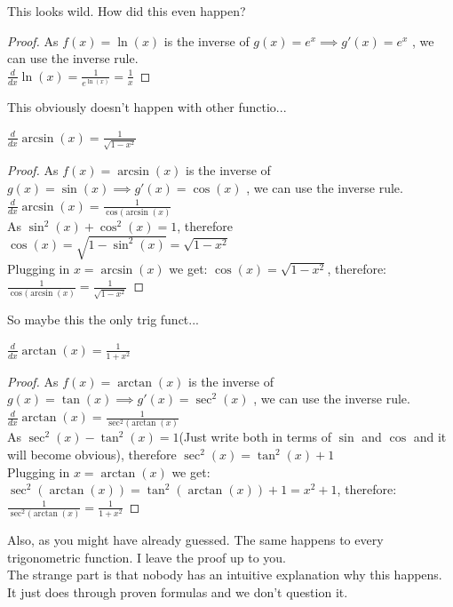 This looks wild. How did this even happen?\\
\begin{proof}
    As $f(x)=\ln(x)$ is the inverse of $g(x)=e^x \implies g'(x)=e^x$ , we can use the inverse rule.\\
    $\frac{d}{dx} \ln(x) = \frac{1}{e^{\ln(x)}}=\frac{1}{x}$
\end{proof}
This obviously doesn't happen with other functio...\\
\begin{theorem}
    $\frac{d}{dx} \arcsin(x)=\frac{1}{\sqrt{1-x^2}}$
\end{theorem}
\begin{proof}
    As $f(x)=\arcsin(x)$ is the inverse of $g(x)=\sin(x) \implies g'(x)=\cos(x)$ , we can use the inverse rule.\\
    $\frac{d}{dx} \arcsin(x) = \frac{1}{\cos(\arcsin(x)}$\\
    As $\sin^2(x)+\cos^2(x)=1$, therefore $\cos(x)=\sqrt{1-\sin^2(x)}=\sqrt{1-x^2}$\\
    Plugging in $x=\arcsin(x)$ we get: $\cos(x)=\sqrt{1-x^2}$, therefore:\\
    $\frac{1}{\cos(\arcsin(x)} = \frac{1}{\sqrt{1-x^2}}$
\end{proof}
So maybe this the only trig funct...\\
\begin{theorem}
    $\frac{d}{dx} \arctan(x)=\frac{1}{1+x^2}$
\end{theorem}
\begin{proof}
    As $f(x)=\arctan(x)$ is the inverse of $g(x)=\tan(x) \implies g'(x)=\sec^2(x)$ , we can use the inverse rule.\\
    $\frac{d}{dx} \arctan(x) = \frac{1}{\sec^2(\arctan(x)}$\\
    As $\sec^2(x)-\tan^2(x)=1$(Just write both in terms of $\sin$ and $\cos$ and it will become obvious), therefore $\sec^2(x)=\tan^2(x)+1$\\
    Plugging in $x=\arctan(x)$ we get: $\sec^2(\arctan(x))=\tan^2(\arctan(x))+1=x^2+1$, therefore:\\
    $\frac{1}{\sec^2(\arctan(x)} = \frac{1}{1+x^2}$
\end{proof}
Also, as you might have already guessed. The same happens to every trigonometric function. I leave the proof up to you.\\
The strange part is that nobody has an intuitive explanation why this happens. It just does through proven formulas and we don't question it.\\
